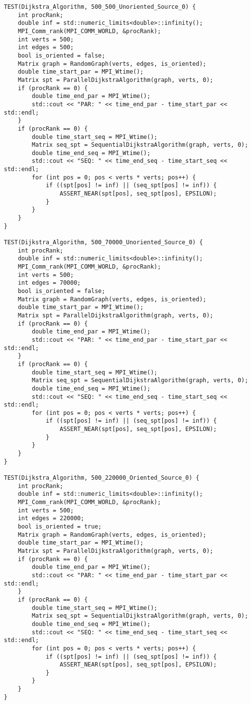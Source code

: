 \documentclass{report}
\begin{document}
\begin{lstlisting}
TEST(Dijkstra_Algorithm, 500_500_Unoriented_Source_0) {
    int procRank;
    double inf = std::numeric_limits<double>::infinity();
    MPI_Comm_rank(MPI_COMM_WORLD, &procRank);
    int verts = 500;
    int edges = 500;
    bool is_oriented = false;
    Matrix graph = RandomGraph(verts, edges, is_oriented);
    double time_start_par = MPI_Wtime();
    Matrix spt = ParallelDijkstraAlgorithm(graph, verts, 0);
    if (procRank == 0) {
        double time_end_par = MPI_Wtime();
        std::cout << "PAR: " << time_end_par - time_start_par << std::endl;
    }
    if (procRank == 0) {
        double time_start_seq = MPI_Wtime();
        Matrix seq_spt = SequentialDijkstraAlgorithm(graph, verts, 0);
        double time_end_seq = MPI_Wtime();
        std::cout << "SEQ: " << time_end_seq - time_start_seq << std::endl;
        for (int pos = 0; pos < verts * verts; pos++) {
            if ((spt[pos] != inf) || (seq_spt[pos] != inf)) {
                ASSERT_NEAR(spt[pos], seq_spt[pos], EPSILON);
            }
        }
    }
}

TEST(Dijkstra_Algorithm, 500_70000_Unoriented_Source_0) {
    int procRank;
    double inf = std::numeric_limits<double>::infinity();
    MPI_Comm_rank(MPI_COMM_WORLD, &procRank);
    int verts = 500;
    int edges = 70000;
    bool is_oriented = false;
    Matrix graph = RandomGraph(verts, edges, is_oriented);
    double time_start_par = MPI_Wtime();
    Matrix spt = ParallelDijkstraAlgorithm(graph, verts, 0);
    if (procRank == 0) {
        double time_end_par = MPI_Wtime();
        std::cout << "PAR: " << time_end_par - time_start_par << std::endl;
    }
    if (procRank == 0) {
        double time_start_seq = MPI_Wtime();
        Matrix seq_spt = SequentialDijkstraAlgorithm(graph, verts, 0);
        double time_end_seq = MPI_Wtime();
        std::cout << "SEQ: " << time_end_seq - time_start_seq << std::endl;
        for (int pos = 0; pos < verts * verts; pos++) {
            if ((spt[pos] != inf) || (seq_spt[pos] != inf)) {
                ASSERT_NEAR(spt[pos], seq_spt[pos], EPSILON);
            }
        }
    }
}

TEST(Dijkstra_Algorithm, 500_220000_Oriented_Source_0) {
    int procRank;
    double inf = std::numeric_limits<double>::infinity();
    MPI_Comm_rank(MPI_COMM_WORLD, &procRank);
    int verts = 500;
    int edges = 220000;
    bool is_oriented = true;
    Matrix graph = RandomGraph(verts, edges, is_oriented);
    double time_start_par = MPI_Wtime();
    Matrix spt = ParallelDijkstraAlgorithm(graph, verts, 0);
    if (procRank == 0) {
        double time_end_par = MPI_Wtime();
        std::cout << "PAR: " << time_end_par - time_start_par << std::endl;
    }
    if (procRank == 0) {
        double time_start_seq = MPI_Wtime();
        Matrix seq_spt = SequentialDijkstraAlgorithm(graph, verts, 0);
        double time_end_seq = MPI_Wtime();
        std::cout << "SEQ: " << time_end_seq - time_start_seq << std::endl;
        for (int pos = 0; pos < verts * verts; pos++) {
            if ((spt[pos] != inf) || (seq_spt[pos] != inf)) {
                ASSERT_NEAR(spt[pos], seq_spt[pos], EPSILON);
            }
        }
    }
}


\end{lstlisting}
\end{document}
